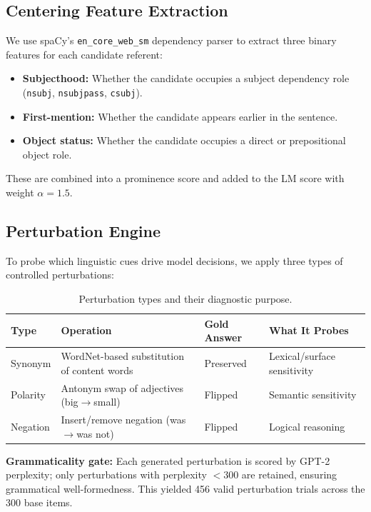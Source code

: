 \documentclass[11pt]{article}
\begin{document}
\subsection{Centering Feature Extraction}

We use spaCy's \texttt{en\_core\_web\_sm} dependency parser to extract three binary features for each candidate referent:
\begin{itemize}[leftmargin=*]
    \item \textbf{Subjecthood:} Whether the candidate occupies a subject dependency role (\texttt{nsubj}, \texttt{nsubjpass}, \texttt{csubj}).
    \item \textbf{First-mention:} Whether the candidate appears earlier in the sentence.
    \item \textbf{Object status:} Whether the candidate occupies a direct or prepositional object role.
\end{itemize}
These are combined into a prominence score and added to the LM score with weight $\alpha=1.5$.

\subsection{Perturbation Engine}

To probe which linguistic cues drive model decisions, we apply three types of controlled perturbations:

\begin{table}[t]
\centering
\caption{Perturbation types and their diagnostic purpose.}
\label{tab:perturbations}
\begin{tabular}{@{}p{2.5cm}p{5cm}p{3cm}p{4cm}@{}}
\toprule
\textbf{Type} & \textbf{Operation} & \textbf{Gold Answer} & \textbf{What It Probes} \\
\midrule
Synonym & WordNet-based substitution of content words & Preserved & Lexical/surface sensitivity \\
Polarity & Antonym swap of adjectives (big$\to$small) & Flipped & Semantic sensitivity \\
Negation & Insert/remove negation (was$\to$was not) & Flipped & Logical reasoning \\
\bottomrule
\end{tabular}
\end{table}

\textbf{Grammaticality gate:} Each generated perturbation is scored by GPT-2 perplexity; only perturbations with perplexity $<300$ are retained, ensuring grammatical well-formedness. This yielded 456 valid perturbation trials across the 300 base items.
\end{document}
